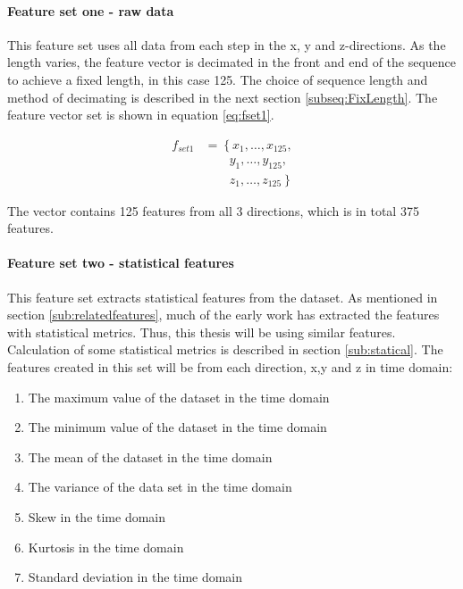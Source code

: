 \documentclass[USenglish]{ifimaster}  %
\begin{document}
\paragraph{Feature set one - raw data} 
This feature set uses all data from each step in the x, y and z-directions. As the length varies, the feature vector is decimated in the front and end of the sequence to achieve a fixed length, in this case 125.  The choice of sequence length and method of decimating is described in the next section \ref{subseq:FixLength}. The feature vector set is shown in equation \ref{eq:fset1}.
	

\begin{align}\label{eq:fset1}
f_{set1} &= \left\{x_1,\dotsc,x_{125}, \right.\nonumber\\
&\qquad \left.{} y_1, \dotsc,y_{125}, \right.\nonumber\\
&\qquad \left.{} z_1,\dotsc,z_{125} \right\}
\end{align}

The vector contains 125 features from all 3 directions, which is in total 375 features.
	

		
		
	
\paragraph{Feature set two - statistical features} 
This feature set extracts statistical features from the dataset. As mentioned in section \ref{sub:relatedfeatures}, much of the early work has extracted the features with statistical metrics. Thus, this thesis will be using similar features. Calculation of some statistical metrics is described in section \ref{sub:statical}. The features created in this set will be from each direction, x,y and z in time domain: 
	
	
	\begin{enumerate}
		\item The maximum value of the dataset in the time domain
		\item The minimum value of the dataset in the time domain
		\item The mean of the dataset in the time domain
		\item The variance of the data set in the time domain
		\item Skew in the time domain
		\item Kurtosis in the time domain 
		\item Standard deviation in the time domain
	\end{enumerate}
	
\end{document}

